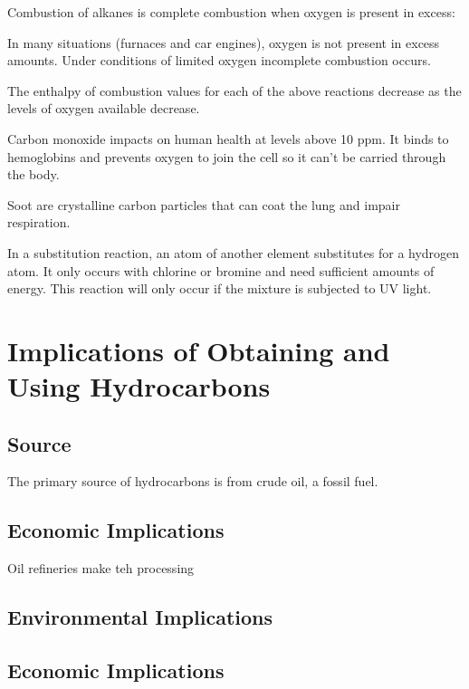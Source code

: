 	Combustion of alkanes is complete combustion when oxygen is present in excess:

		\begin{center}
		\end{center}

	In many situations (furnaces and car engines), oxygen is not present in excess amounts. Under conditions of limited oxygen incomplete combustion occurs.

	The enthalpy of combustion values for each of the above reactions decrease as the levels of oxygen available decrease.

	Carbon monoxide impacts on human health at levels above 10 ppm. It binds to hemoglobins and prevents oxygen to join the cell so it can't be carried through the body.

	Soot are crystalline carbon particles that can coat the lung and impair respiration.

	In a substitution reaction, an atom of another element substitutes for a hydrogen atom. It only occurs with chlorine or bromine and need sufficient amounts of energy. This reaction will only occur if the mixture is subjected to UV light.

\section{Implications of Obtaining and Using Hydrocarbons}
	
	\subsection{Source}
	
		The primary source of hydrocarbons is from crude oil, a fossil fuel. 

	\subsection{Economic Implications}
		
		Oil refineries make teh processing
	\subsection{Environmental Implications}
	\subsection{Economic Implications}
	
